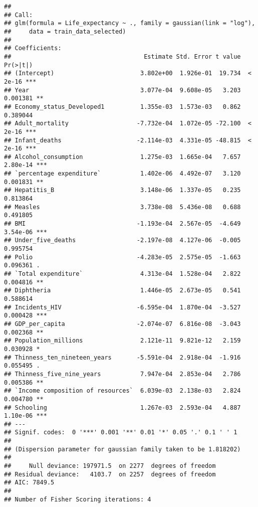 \documentclass[
]{article}
\begin{document}
\begin{verbatim}
## 
## Call:
## glm(formula = Life_expectancy ~ ., family = gaussian(link = "log"), 
##     data = train_data_selected)
## 
## Coefficients:
##                                     Estimate Std. Error t value Pr(>|t|)    
## (Intercept)                        3.802e+00  1.926e-01  19.734  < 2e-16 ***
## Year                               3.077e-04  9.608e-05   3.203 0.001381 ** 
## Economy_status_Developed1          1.355e-03  1.573e-03   0.862 0.389044    
## Adult_mortality                   -7.732e-04  1.072e-05 -72.100  < 2e-16 ***
## Infant_deaths                     -2.114e-03  4.331e-05 -48.815  < 2e-16 ***
## Alcohol_consumption                1.275e-03  1.665e-04   7.657 2.80e-14 ***
## `percentage expenditure`           1.402e-06  4.492e-07   3.120 0.001831 ** 
## Hepatitis_B                        3.148e-06  1.337e-05   0.235 0.813864    
## Measles                            3.738e-08  5.436e-08   0.688 0.491805    
## BMI                               -1.193e-04  2.567e-05  -4.649 3.54e-06 ***
## Under_five_deaths                 -2.197e-08  4.127e-06  -0.005 0.995754    
## Polio                             -4.283e-05  2.575e-05  -1.663 0.096361 .  
## `Total expenditure`                4.313e-04  1.528e-04   2.822 0.004816 ** 
## Diphtheria                         1.446e-05  2.673e-05   0.541 0.588614    
## Incidents_HIV                     -6.595e-04  1.870e-04  -3.527 0.000428 ***
## GDP_per_capita                    -2.074e-07  6.816e-08  -3.043 0.002368 ** 
## Population_millions                2.121e-11  9.821e-12   2.159 0.030928 *  
## Thinness_ten_nineteen_years       -5.591e-04  2.918e-04  -1.916 0.055495 .  
## Thinness_five_nine_years           7.947e-04  2.853e-04   2.786 0.005386 ** 
## `Income composition of resources`  6.039e-03  2.138e-03   2.824 0.004780 ** 
## Schooling                          1.267e-03  2.593e-04   4.887 1.10e-06 ***
## ---
## Signif. codes:  0 '***' 0.001 '**' 0.01 '*' 0.05 '.' 0.1 ' ' 1
## 
## (Dispersion parameter for gaussian family taken to be 1.818202)
## 
##     Null deviance: 197971.5  on 2277  degrees of freedom
## Residual deviance:   4103.7  on 2257  degrees of freedom
## AIC: 7849.5
## 
## Number of Fisher Scoring iterations: 4
\end{verbatim}
\end{document}
